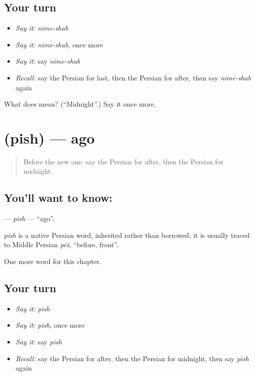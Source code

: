 \subsection*{Your turn}
\begin{itemize}
\raggedright
  \item \emph{Say it:} \emph{nime-shab}
  \item \emph{Say it:} \emph{nime-shab}, once more
  \item \emph{Say it:} say \emph{nime-shab}
  \item \emph{Recall:} say the Persian for last, then the Persian for after, then say \emph{nime-shab} again
\end{itemize}

\begin{tcolorbox}[breakable,colback=teal!4,colframe=teal!35!black,title={Before you move on}]
What does   mean? (\textquotedblleft{}Midnight\textquotedblright{}.) Say it once more.
\end{tcolorbox}
\section[\texorpdfstring{\fa{پیش} (pish)}{پیش (pish)}]{ (pish) — ago}

\label{lesson:FA-C153-pish}



\begin{quote}
Before the new one: say the Persian for after, then the Persian for midnight.
\end{quote}

\subsection*{You'll want to know: }
\textbf{} — \emph{pish} — \textquotedblleft{}ago\textquotedblright{}.

\begin{cousinweb}
\emph{pish} is a native Persian word, inherited rather than borrowed; it is usually traced to Middle Persian \emph{pēš}, \textquotedblleft{}before, front\textquotedblright{}.
\end{cousinweb}

\begin{grammarlens}[title={What you've built}]
One more word for this chapter.
\end{grammarlens}

\subsection*{Your turn}
\begin{itemize}
\raggedright
  \item \emph{Say it:} \emph{pish}
  \item \emph{Say it:} \emph{pish}, once more
  \item \emph{Say it:} say \emph{pish}
  \item \emph{Recall:} say the Persian for after, then the Persian for midnight, then say \emph{pish} again
\end{itemize}

